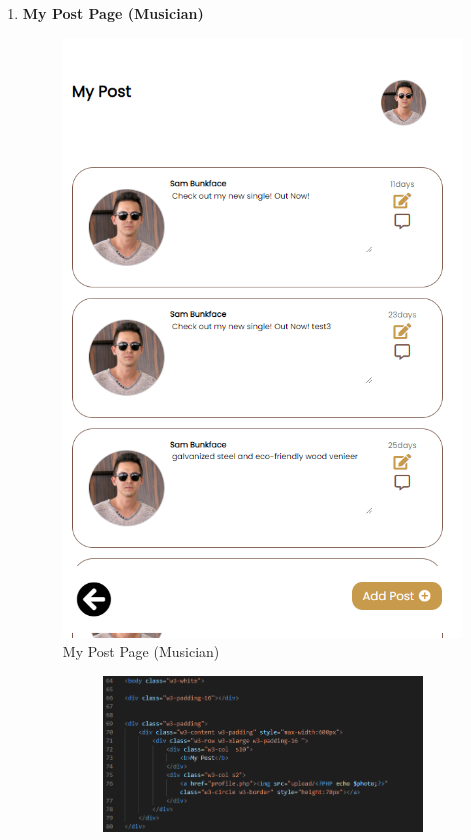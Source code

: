 \begin{enumerate}[1.]
    \item \textbf{My Post Page (Musician)}
    \begin{figure}[h]
        \centering
        \includegraphics[width=0.5\linewidth]{mainmatter/images/frontend/ss/My Post (Musician).png}
        \caption{My Post Page (Musician)}
        \label{fig:myfig59}
    \end{figure}
    \begin{figure}[h]\ContinuedFloat
        \centering
        \begin{subfigure}[b]{0.7\textwidth}
            \centering
            \includegraphics[width=\textwidth]{mainmatter/images/frontend/code/mpost.png}
            \label{fig:sub1}
        \end{subfigure}
        \hspace{0.04\textwidth}
        \begin{subfigure}[b]{0.6\textwidth}
            \centering

\end{subfigure}
\end{figure}
\end{enumerate}
